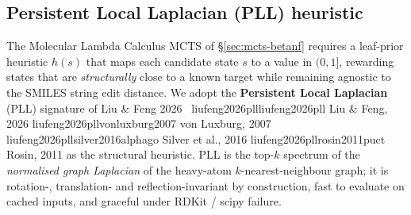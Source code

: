 %
%

\makeatletter
\def\WFliuFeng2026Key{liufeng2026pll}
\def\WFvonLuxburg2007Key{vonluxburg2007}
\def\WFsilver2016Key{silver2016alphago}
\def\WFrosin2011Key{rosin2011puct}
\def\WFluxburgNormKey{vonluxburg2007}
\let\WForigCiteThreeThree\WForiginalCite
\def\WFcitePlainThreeThree#1{%
  \def\WFciteTempKeyThreeThree{#1}%
  \ifx\WFciteTempKeyThreeThree\WFliuFeng2026Key Liu \& Feng, 2026%
  \else\ifx\WFciteTempKeyThreeThree\WFvonLuxburg2007Key von Luxburg, 2007%
  \else\ifx\WFciteTempKeyThreeThree\WFsilver2016Key Silver et al., 2016%
  \else\ifx\WFciteTempKeyThreeThree\WFrosin2011Key Rosin, 2011%
  \else \WForigCiteThreeThree{#1}%
  \fi\fi\fi\fi
}
\let\cite\WFcitePlainThreeThree
\makeatother

\subsection{Persistent Local Laplacian (PLL) heuristic}
\label{sec:pll-heuristic}

The Molecular Lambda Calculus MCTS of \S\ref{sec:mcts-betanf}
requires a leaf-prior heuristic $h(s)$ that maps each candidate
state $s$ to a value in $(0,1]$, rewarding states that are
\emph{structurally} close to a known target while remaining
agnostic to the SMILES string edit distance.  We adopt the
\textbf{Persistent Local Laplacian} (PLL) signature of
Liu \& Feng 2026~\cite{liufeng2026pll} as the structural
heuristic.  PLL is the top-$k$ spectrum of the
\emph{normalised graph Laplacian} of the heavy-atom
$k$-nearest-neighbour graph; it is rotation-, translation- and
reflection-invariant by construction, fast to evaluate on
cached inputs, and graceful under RDKit / scipy failure.

